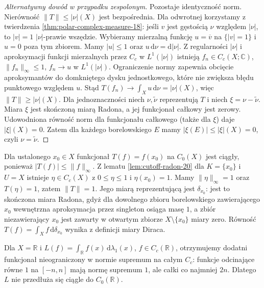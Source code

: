 \begin{proof}[Alternatywny dowód w przypadku zespolonym]
Pozostaje identyczność norm. Nierówność
$\|T\|\le|\nu|(X)$ jest bezpośrednia. Dla odwrotnej
korzystamy z twierdzenia \ref{thm:polar-complex-measure-18}:
jeśli $v$ jest gęstością $\nu$ względem $|\nu|$, to
$|v|=1$ $|\nu|$-prawie wszędzie. Wybieramy mierzalną
funkcję $u=\overline v$ na $\{|v|=1\}$ i $u=0$ poza tym
zbiorem. Mamy $|u|\le1$ oraz $u\,\mathrm d\nu=\mathrm d|\nu|$.
Z regularności $|\nu|$ i aproksymacji funkcji
mierzalnych przez $C_c$ w $L^1(|\nu|)$ istnieją
$f_n\in C_c(X;\mathbb C)$, $\|f_n\|_\infty\le1$,
$f_n\to u$ w $L^1(|\nu|)$. Ograniczenie normy
zapewnia obcięcie aproksymantów do domkniętego
dysku jednostkowego, które nie zwiększa błędu
punktowego względem $u$. Stąd
$T(f_n)\to\int_Xu\,\mathrm d\nu=|\nu|(X)$,
więc $\|T\|\ge|\nu|(X)$.
Dla jednoznaczności niech $\nu,\widetilde\nu$ reprezentują
$T$ i niech $\xi=\nu-\widetilde\nu$. Miara $\xi$ jest
skończoną miarą Radona, a jej funkcjonał całkowy jest zerowy.
Udowodniona równość norm dla funkcjonału całkowego
(także dla $\xi$) daje $|\xi|(X)=0$. Zatem dla każdego
borelowskiego $E$ mamy $|\xi(E)|\le|\xi|(X)=0$,
czyli $\nu=\widetilde\nu$.
\end{proof}



\begin{przyklad}
Dla ustalonego $x_0\in X$ funkcjonał $T(f)=f(x_0)$
na $C_0(X)$ jest ciągły, ponieważ
$|T(f)|\le\|f\|_\infty$. Z lematu
\ref{lem:cutoff-radon-20} dla $K=\{x_0\}$ i $U=X$
istnieje $\eta\in C_c(X)$ z $0\le\eta\le1$
i $\eta(x_0)=1$. Mamy $\|\eta\|_\infty=1$
oraz $T(\eta)=1$, zatem $\|T\|=1$.
Jego miarą reprezentującą jest $\delta_{x_0}$:
jest to skończona miara Radona, gdyż dla dowolnego
zbioru borelowskiego zawierającego $x_0$ wewnętrzna
aproksymacja przez singleton osiąga masę $1$,
a zbiór niezawierający $x_0$ jest zawarty
w otwartym zbiorze $X\setminus\{x_0\}$ miary zero.
Równość $T(f)=\int_X f\,\mathrm d\delta_{x_0}$
wynika z definicji miary Diraca.
\end{przyklad}

\begin{przyklad}
Dla $X=\mathbb R$ i $L(f)=\int_{\mathbb R} f(x)
\,\mathrm d\lambda_1(x)$, $f\in C_c(\mathbb R)$,
otrzymujemy dodatni funkcjonał nieograniczony w normie
supremum na całym $C_c$: funkcje odcinające równe $1$
na $[-n,n]$ mają normę supremum $1$, ale całki
co najmniej $2n$. Dlatego $L$ nie przedłuża się
ciągle do $C_0(\mathbb R)$.
\end{przyklad}

